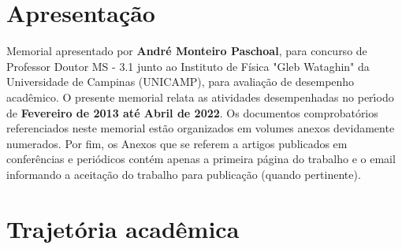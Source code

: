\documentclass[a4paper,oneside,10pt]{article}
\newcounter{document}%
\begin{document}
\tableofcontents


\newpage
\section*{Apresenta\c{c}\~{a}o}
\vspace{0.3cm}

\begin{onehalfspace}

Memorial apresentado por \textbf{André Monteiro Paschoal}, para concurso de Professor Doutor MS - 3.1 junto ao Instituto de Física "Gleb Wataghin" da Universidade de Campinas (UNICAMP), para avalia\c{c}\~{a}o de desempenho acad\^{e}mico.
O presente memorial relata as atividades desempenhadas no per\'{\i}odo de \textbf{Fevereiro de 2013 até Abril de 2022}. Os documentos comprobat\'{o}rios referenciados neste memorial est\~{a}o organizados em volumes anexos devidamente numerados. 
Por fim, os Anexos que se referem a artigos publicados em confer\^{e}ncias e peri\'{o}dicos cont\'{e}m apenas a primeira p\'{a}gina do trabalho e o email informando a aceita\c{c}\~{a}o do trabalho para publica\c{c}\~{a}o (quando pertinente).

\end{onehalfspace}


\newpage
\section{Trajet\'{o}ria acad\^{e}mica}
\vspace{0.3cm}
\end{document}
